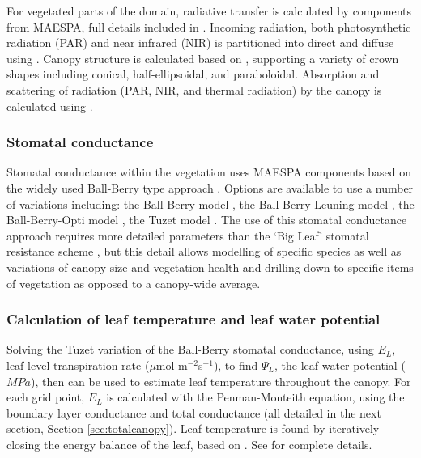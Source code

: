 \documentclass[final,3p,times,authoryear]{elsarticle}
\begin{document}
For vegetated parts of the domain, radiative transfer is calculated by components from MAESPA, full details included in \cite{Duursma2012}. Incoming radiation, both photosynthetic radiation (PAR) and near infrared (NIR) is partitioned into direct and diffuse using \cite{Weiss1985}. Canopy structure is calculated based on \cite{Wang1990}, supporting a variety of crown shapes including conical, half-ellipsoidal, and paraboloidal. Absorption and scattering of radiation (PAR, NIR, and thermal radiation) by the canopy is calculated using \cite{Norman1979}. 

\subsubsection{Stomatal conductance}\label{Stomatalconductance}
Stomatal conductance within the vegetation uses MAESPA components based on the widely used Ball-Berry type approach \citep{Ball1987,Duursma2012}. Options are available to use a number of variations including: the Ball-Berry model \citep{Ball1987}, the Ball-Berry-Leuning model \citep{Leuning1995}, the Ball-Berry-Opti model \citep{Medlyn2011}, the Tuzet model \citep{Tuzet2003}. The use of this stomatal conductance approach requires more detailed parameters than the `Big Leaf' stomatal resistance scheme \citep{Bailey1981,Kowalczyk1991}, but this detail allows modelling of specific species as well as variations of canopy size and vegetation health and drilling down to specific items of vegetation \citep{Duursma2012} as opposed to a canopy-wide average. 

\subsubsection{Calculation of leaf temperature and leaf water potential}\label{sec:calcleaftemp}
Solving the Tuzet variation of the Ball-Berry stomatal conductance, using $E_{L}$, leaf level transpiration rate ($\mu$mol m$^{-2}$s$^{-1}$), to find $\Psi_{L}$, the leaf water potential ($MPa$), then can be used to estimate leaf temperature throughout the canopy. For each grid point, $E_{L}$ is calculated with the Penman-Monteith equation, using the boundary layer conductance and total conductance (all detailed in the next section, Section \ref{sec:totalcanopy}). Leaf temperature is found by iteratively closing the energy balance of the leaf, based on \cite{Wang1998}. See \cite{Duursma2012} for complete details.

\end{document}

